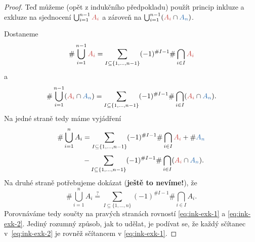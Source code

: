 \begin{proof}
 Teď můžeme (opět z indukčního předpokladu) použít princip inkluze a exkluze na
 sjednocení $\bigcup_{i=1}^{n-1} \clr{A_i}$ a zároveň na $\bigcup_{i=1}^{n-1}
 (\clr{A_i} \cap \clb{A_n})$.

 Dostaneme
 \[
  \# \bigcup_{i=1}^{n-1} \clr{A_i} = \sum_{I \subseteq \{1,\ldots,n-1\}}
  (-1)^{\# I - 1} \# \bigcap_{i \in  I}^{} \clr{A_i}
 \]
 a
 \[
  \# \bigcup_{i=1}^{n-1} (\clr{A_i} \cap \clb{A_n}) = \sum_{I \subseteq
  \{1,\ldots,n-1\}}^{} (-1)^{\# I - 1} \# \bigcap_{i \in  I}^{} (\clr{A_i} \cap
  \clb{A_n}). 
 \]
 Na jedné straně tedy máme vyjádření
 \begin{equation}
  \label{eq:ink-exk-1}
  \begin{split}
   \# \bigcup_{i=1}^{n} A_i &= \sum_{I \subseteq \{1,\ldots,n-1\}}^{} (-1)^{\# I -
   1} \# \bigcap_{i \in  I}^{} \clr{A_i} + \# \clb{A_n}\\
   &- \sum_{I \subseteq \{1,\ldots,n-1\}}^{} (-1)^{\# I - 1} \# \bigcap_{i \in
   I}^{} (\clr{A_i} \cap \clb{A_n}).
  \end{split}
 \end{equation}
 Na druhé straně potřebujeme dokázat (\textbf{ještě to nevíme!}), že
 \begin{equation}
  \label{eq:ink-exk-2}
  \# \bigcup_{i=1}^{n} A_i  \overset{?}{=} \sum_{I \subseteq \{1,\ldots,n\}}^{}
  (-1)^{\# I - 1} \# \bigcap_{i \in  I}^{} A_i.
 \end{equation}
 Porovnáváme tedy součty na pravých stranách rovností \eqref{eq:ink-exk-1} a
 \eqref{eq:ink-exk-2}. Jediný rozumný způsob, jak to udělat, je podívat se, že
 každý sčítanec v~\eqref{eq:ink-exk-2} je rovněž sčítancem v
 \eqref{eq:ink-exk-1}.


\end{proof}
